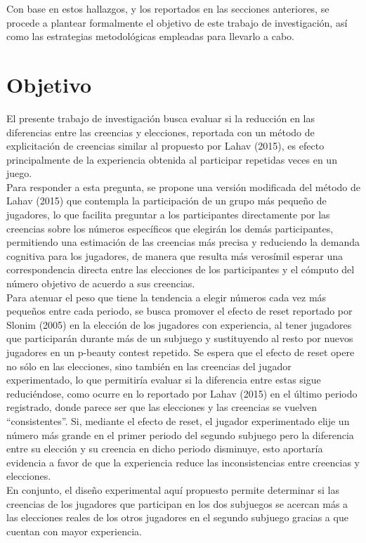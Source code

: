 Con base en estos hallazgos, y los reportados en las secciones anteriores, se procede a plantear formalmente el objetivo de este trabajo de investigación, así como las estrategias metodológicas empleadas para llevarlo a cabo. \\

\section{Objetivo}

El presente trabajo de investigación busca evaluar si la reducción en las diferencias entre las creencias y elecciones, reportada con un método de explicitación de creencias similar al propuesto por Lahav (2015), es efecto principalmente de la experiencia obtenida al participar repetidas veces en un juego.\\

Para responder a esta pregunta, se propone una versión modificada del método de Lahav (2015) que contempla la participación de un grupo más pequeño de jugadores, lo que facilita preguntar a los participantes directamente por las creencias sobre los números específicos que elegirán los demás participantes, permitiendo una estimación de las creencias más precisa y reduciendo la demanda cognitiva para los jugadores, de manera que resulta más verosímil esperar una correspondencia directa entre las elecciones de los participantes y el cómputo del número objetivo de acuerdo a sus creencias.\\

Para atenuar el peso que tiene la tendencia a elegir números cada vez más pequeños entre cada periodo, se busca promover el efecto de reset reportado por Slonim (2005) en la elección de los jugadores con experiencia, al tener jugadores que participarán durante más de un subjuego y sustituyendo al resto por nuevos jugadores en un p-beauty contest repetido. Se espera que el efecto de reset opere no sólo en las elecciones, sino también en las creencias del jugador experimentado, lo que permitiría evaluar si la diferencia entre estas sigue reduciéndose, como ocurre en lo reportado por Lahav (2015) en el último periodo registrado, donde parece ser que las elecciones y las creencias se vuelven “consistentes”. Si, mediante el efecto de reset, el jugador experimentado elije un número más grande en el primer periodo del segundo subjuego pero la diferencia entre su elección y su creencia en dicho periodo disminuye, esto aportaría evidencia a favor de que la experiencia reduce las inconsistencias entre creencias y elecciones.\\

En conjunto, el diseño experimental aquí propuesto permite determinar si las creencias de los jugadores que participan en los dos subjuegos se acercan más a las elecciones reales de los otros jugadores en el segundo subjuego gracias a que cuentan con mayor experiencia.\\


